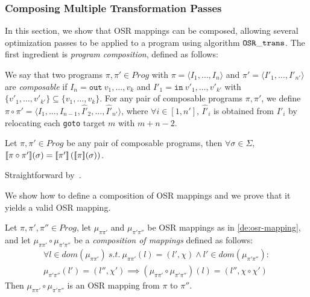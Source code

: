 \subsubsection{Composing Multiple Transformation Passes}
\label{ss:trans-compose}

In this section, we show that OSR mappings can be composed, allowing several optimization passes to be applied to a program using algorithm ${\tt OSR\_trans}$. The first ingredient is {\em program composition}, defined as follows:

\begin{definition}
\label{de:composition}
We say that two programs $\pi,\pi'\in Prog$ with $\pi=\langle I_1,\ldots,I_n\rangle$ and $\pi'=\langle I'_1,\ldots,I'_{n'}\rangle$ are {\em composable} if $I_n=\texttt{out}~v_1,\ldots,v_k$ and $I'_1=\texttt{in}~v'_1,\ldots,v'_{k'}$ with $\{v'_1,\ldots,v'_{k'}\}\subseteq\{v_1,\ldots,v_k\}$. For any pair of composable programs $\pi,\pi'$, we define $\pi\circ\pi'=\langle I_1,\ldots,I_{n-1},\hat{I'}_2,\ldots,\hat{I'}_{n'}\rangle$, where $\forall i\in[1,n']$, $\hat{I'}_i$ is obtained from $I'_i$ by relocating each {\tt goto} target $m$ with $m+n-2$.
\iffalse
where $\chi\circ\chi'=\chi\setminus\{{\tt out \ldots}\}\cdot\chi'\left[
\begin{tiny}
\begin{array}{l}
\texttt{goto}~m\mapsto \\
\texttt{goto}~m+|\chi|-2
\end{array}
\end{tiny}
\right]\setminus\{{\tt in \ldots}\}$. 
\fi
\end{definition}

\begin{lemma}
\label{le:prog-comp-sem}
Let $\pi,\pi'\in Prog$ be any pair of composable programs, then $\forall\sigma\in\Sigma,$ $[\![\pi\circ\pi']\!](\sigma)=[\![\pi']\!]\left([\![\pi]\!](\sigma)\right)$.
\end{lemma}
\begin{myproof}
Straightforward by~.
\end{myproof}

\noindent We show how to define a composition of OSR mappings and we prove that it yields a valid OSR mapping.

\begin{lemma}
\label{le:osr-mapping-comp}
Let $\pi,\pi',\pi''\in Prog$, let $\mu_{\pi\pi'}$ and $\mu_{\pi'\pi''}$ be OSR mappings as in \mydefinition\ref{de:osr-mapping}, and let $\mu_{\pi\pi'}\circ\mu_{\pi'\pi''}$ be a {\em composition of mappings} defined as follows:
\begin{gather*}
\forall l\in dom(\mu_{\pi\pi'})~s.t.~\mu_{\pi\pi'}(l)=(l',\chi)\wedge l'\in dom(\mu_{\pi'\pi''}):\\
\mu_{\pi'\pi''}(l')=(l'',\chi')\implies(\mu_{\pi\pi'}\circ\mu_{\pi'\pi''})(l)=(l'',\chi\circ\chi')
\end{gather*}
Then $\mu_{\pi\pi'}\circ\mu_{\pi'\pi''}$ is an OSR mapping from $\pi$ to $\pi''$.
\end{lemma}

